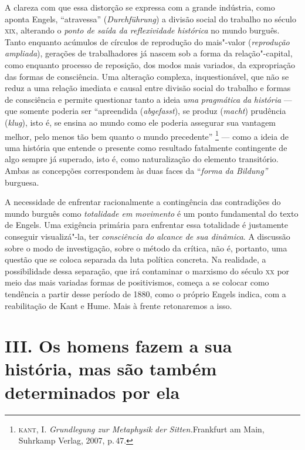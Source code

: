 A clareza com que essa distorção se expressa com a grande indústria,
como aponta Engels, ``atravessa'' (\emph{Durchführung}) a divisão social
do trabalho no século \textsc{xix}, alterando o \emph{ponto de saída da
reflexividade histórica} no mundo burguês. Tanto enquanto acúmulos de
círculos de reprodução do mais"-valor (\emph{reprodução ampliada}),
gerações de trabalhadores já nascem sob a forma da relação"-capital, como
enquanto processo de reposição, dos modos mais variados, da expropriação
das formas de consciência. Uma alteração complexa, inquestionável, que
não se reduz a uma relação imediata e causal entre divisão social do
trabalho e formas de consciência e permite questionar tanto a ideia
\emph{uma} \emph{pragmática} \emph{da} \emph{história} --- que somente
poderia ser ``apreendida (\emph{abgefasst}), se produz (\emph{macht})
prudência (\emph{klug}), isto é, se ensina ao mundo como ele poderia
assegurar sua vantagem melhor, pelo menos tão bem quanto o mundo
precedente'' \footnote{\textsc{kant}, I. \emph{Grundlegung zur Metaphysik der
  Sitten.}Frankfurt am Main, Suhrkamp Verlag, 2007, p.\,47.} --- como a
ideia de uma história que entende o presente como resultado fatalmente
contingente de algo sempre já superado, isto é, como naturalização do
elemento transitório. Ambas as concepções correspondem às duas faces da
``\emph{forma da Bildung''} burguesa.

A necessidade de enfrentar racionalmente a contingência das contradições
do mundo burguês como \emph{totalidade em movimento} é um ponto
fundamental do texto de Engels. Uma exigência primária para enfrentar
essa totalidade é justamente conseguir visualizá"-la, ter
\emph{consciência do alcance de sua dinâmica}. A discussão sobre o modo
de investigação, sobre o método da crítica, não é, portanto, uma questão
que se coloca separada da luta política concreta. Na realidade, a
possibilidade dessa separação, que irá contaminar o marxismo do século
\textsc{xx} por meio das mais variadas formas de positivismos, começa a se
colocar como tendência a partir desse período de 1880, como o próprio
Engels indica, com a reabilitação de Kant e Hume. Mais à frente
retonaremos a isso.

\section*{III. Os homens fazem a sua história, mas são também determinados por ela}

